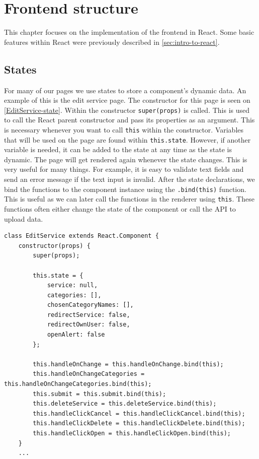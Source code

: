 \section{Frontend structure}
This chapter focuses on the implementation of the frontend in React.
Some basic features within React were previously described in \autoref{sec:intro-to-react}.

\subsection{States}
For many of our pages we use states to store a component's dynamic data. 
An example of this is the edit service page. 
The constructor for this page is seen on \autoref{EditService-state}.
Within the constructor \texttt{super(props)} is called. 
This is used to call the React parent constructor and pass its properties as an argument.
This is necessary whenever you want to call \texttt{this} within the constructor.
Variables that will be used on the page are found within \texttt{this.state}. 
However, if another variable is needed, it can be added to the state at any time as the state is dynamic.
The page will get rendered again whenever the state changes. 
This is very useful for many things. 
For example, it is easy to validate text fields and send an error message if the text input is invalid.  
After the state declarations, we bind the functions to the component instance using the \texttt{.bind(this)} function.
This is useful as we can later call the functions in the renderer using \texttt{this}.
These functions often either change the state of the component or call the API to upload data.
\begin{lstlisting}[caption={Constructor and state for edit service}, captionpos=b, label={EditService-state}]
class EditService extends React.Component {
    constructor(props) {
        super(props);
    
        this.state = {
            service: null,
            categories: [],
            chosenCategoryNames: [],
            redirectService: false,
            redirectOwnUser: false,
            openAlert: false
        };
            
        this.handleOnChange = this.handleOnChange.bind(this);
        this.handleOnChangeCategories = this.handleOnChangeCategories.bind(this);
        this.submit = this.submit.bind(this);
        this.deleteService = this.deleteService.bind(this);
        this.handleClickCancel = this.handleClickCancel.bind(this);
        this.handleClickDelete = this.handleClickDelete.bind(this);
        this.handleClickOpen = this.handleClickOpen.bind(this);
    }
    ...
\end{lstlisting}

